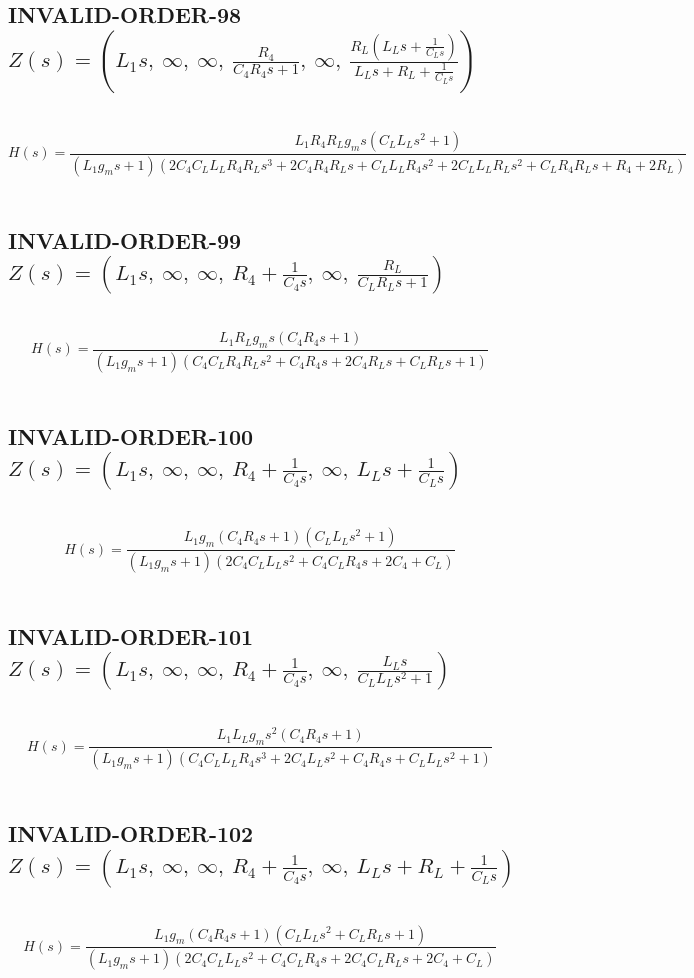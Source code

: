\documentclass{article}
\begin{document}
\subsection{INVALID-ORDER-98 $Z(s) = \left( L_{1} s, \  \infty, \  \infty, \  \frac{R_{4}}{C_{4} R_{4} s + 1}, \  \infty, \  \frac{R_{L} \left(L_{L} s + \frac{1}{C_{L} s}\right)}{L_{L} s + R_{L} + \frac{1}{C_{L} s}}\right)$ } \ 
\textbf{\[H(s) = \frac{L_{1} R_{4} R_{L} g_{m} s \left(C_{L} L_{L} s^{2} + 1\right)}{\left(L_{1} g_{m} s + 1\right) \left(2 C_{4} C_{L} L_{L} R_{4} R_{L} s^{3} + 2 C_{4} R_{4} R_{L} s + C_{L} L_{L} R_{4} s^{2} + 2 C_{L} L_{L} R_{L} s^{2} + C_{L} R_{4} R_{L} s + R_{4} + 2 R_{L}\right)}\] } \ 
\subsection{INVALID-ORDER-99 $Z(s) = \left( L_{1} s, \  \infty, \  \infty, \  R_{4} + \frac{1}{C_{4} s}, \  \infty, \  \frac{R_{L}}{C_{L} R_{L} s + 1}\right)$ } \ 
\textbf{\[H(s) = \frac{L_{1} R_{L} g_{m} s \left(C_{4} R_{4} s + 1\right)}{\left(L_{1} g_{m} s + 1\right) \left(C_{4} C_{L} R_{4} R_{L} s^{2} + C_{4} R_{4} s + 2 C_{4} R_{L} s + C_{L} R_{L} s + 1\right)}\] } \ 
\subsection{INVALID-ORDER-100 $Z(s) = \left( L_{1} s, \  \infty, \  \infty, \  R_{4} + \frac{1}{C_{4} s}, \  \infty, \  L_{L} s + \frac{1}{C_{L} s}\right)$ } \ 
\textbf{\[H(s) = \frac{L_{1} g_{m} \left(C_{4} R_{4} s + 1\right) \left(C_{L} L_{L} s^{2} + 1\right)}{\left(L_{1} g_{m} s + 1\right) \left(2 C_{4} C_{L} L_{L} s^{2} + C_{4} C_{L} R_{4} s + 2 C_{4} + C_{L}\right)}\] } \ 
\subsection{INVALID-ORDER-101 $Z(s) = \left( L_{1} s, \  \infty, \  \infty, \  R_{4} + \frac{1}{C_{4} s}, \  \infty, \  \frac{L_{L} s}{C_{L} L_{L} s^{2} + 1}\right)$ } \ 
\textbf{\[H(s) = \frac{L_{1} L_{L} g_{m} s^{2} \left(C_{4} R_{4} s + 1\right)}{\left(L_{1} g_{m} s + 1\right) \left(C_{4} C_{L} L_{L} R_{4} s^{3} + 2 C_{4} L_{L} s^{2} + C_{4} R_{4} s + C_{L} L_{L} s^{2} + 1\right)}\] } \ 
\subsection{INVALID-ORDER-102 $Z(s) = \left( L_{1} s, \  \infty, \  \infty, \  R_{4} + \frac{1}{C_{4} s}, \  \infty, \  L_{L} s + R_{L} + \frac{1}{C_{L} s}\right)$ } \ 
\textbf{\[H(s) = \frac{L_{1} g_{m} \left(C_{4} R_{4} s + 1\right) \left(C_{L} L_{L} s^{2} + C_{L} R_{L} s + 1\right)}{\left(L_{1} g_{m} s + 1\right) \left(2 C_{4} C_{L} L_{L} s^{2} + C_{4} C_{L} R_{4} s + 2 C_{4} C_{L} R_{L} s + 2 C_{4} + C_{L}\right)}\] } \ 
\end{document}
